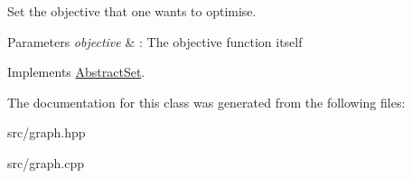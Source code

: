 Set the objective that one wants to optimise. 


\begin{DoxyParams}{Parameters}
{\em objective} & \-: The objective function itself \\
\hline
\end{DoxyParams}


Implements \hyperlink{classAbstractSet_a7aef71679a18ab7965d1098da15b26c2}{Abstract\-Set}.



The documentation for this class was generated from the following files\-:\begin{DoxyCompactItemize}
\item 
src/graph.\-hpp\item 
src/graph.\-cpp\end{DoxyCompactItemize}
